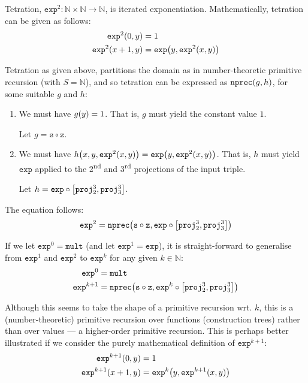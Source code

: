 Tetration, $\mathtt{exp}^2 : \mathbb{N} \times \mathbb{N} \rightarrow
\mathbb{N}$, is iterated exponentiation. Mathematically, tetration can be given
as follows:\begin{align*}
%
\mathtt{exp}^2\p{0,y} &= 1 \\
%
\mathtt{exp}^2\p{x+1, y} &= \mathtt{exp}\p{y,\mathtt{exp}^2\p{x,y}}
%
\end{align*}

Tetration as given above, partitions the domain as in number-theoretic
primitive recursion (with $S = \mathbb{N}$), and so tetration can be expressed
as $\mathtt{nprec}{\mathopen{}\left({g,h}\right)\mathclose{}}$, for some suitable $g$ and $h$:

\begin{enumerate}[label=(\arabic*)]

\item We must have $g{\mathopen{}\left({y}\right)\mathclose{}} = 1$. That is, $g$ must yield the constant value $1$.

Let $g = \mathtt{s} \circ \mathtt{z}$.

\item We must have $h{\mathopen{}\left({x,y,\mathtt{exp}^2{\mathopen{}\left({x,y}\right)\mathclose{}}}\right)\mathclose{}} = \mathtt{exp}{\mathopen{}\left({y,
\mathtt{exp}^2{\mathopen{}\left({x,y}\right)\mathclose{}}}\right)\mathclose{}}$. That is, $h$ must yield $\mathtt{exp}$ applied to the
2\textsuperscript{nd} and 3\textsuperscript{rd} projections of the input
triple.

Let $h = \mathtt{exp} \circ \mathopen{}\left[{\mathtt{proj}^3_2,\mathtt{proj}^3_3}\right]\mathclose{}$.

\end{enumerate}

The equation follows:\begin{align*}
%
\mathtt{exp}^2 = \mathtt{nprec}\p{\mathtt{s} \circ \mathtt{z}, \mathtt{exp}
\circ \seq{\mathtt{proj}^3_2, \mathtt{proj}^3_3}}
%
\end{align*}

If we let $\mathtt{exp}^0 = \mathtt{mult}$ (and let $\mathtt{exp}^1 =
\mathtt{exp}$), it is straight-forward to generalise from $\mathtt{exp}^1$ and
$\mathtt{exp}^2$ to $\mathtt{exp}^k$ for any given $k \in
\mathbb{N}$:\begin{align*}
%
\mathtt{exp}^0 &= \mathtt{mult} \\
%
\mathtt{exp}^{k+1} &= \mathtt{nprec}\p{\mathtt{s} \circ \mathtt{z},
\mathtt{exp}^k \circ \seq{\mathtt{proj}^3_2, \mathtt{proj}^3_3}}
%
\end{align*}

Although this seems to take the shape of a primitive recursion wrt. $k$, this
is a (number-theoretic) primitive recursion over functions (construction trees)
rather than over values --- a higher-order primitive recursion. This is perhaps
better illustrated if we consider the purely mathematical definition of
$\mathtt{exp}^{k+1}$:\begin{align*}
%
\mathtt{exp}^{k+1}\p{0,y} &= 1 \\
%
\mathtt{exp}^{k+1}\p{x+1,y} &= \mathtt{exp}^k\p{y,\mathtt{exp}^{k+1}\p{x,y}}
%
\end{align*}

